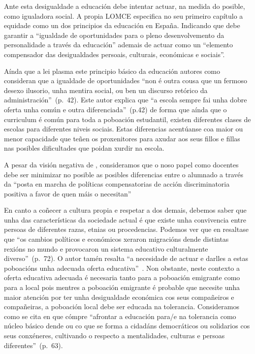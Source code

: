 Ante esta desigualdade a educación debe intentar actuar, na medida do posible, como igualadora social. A propia LOMCE especifica no seu primeiro capítulo a equidade como un dos principios da educación en España. Indicando que debe garantir a ``igualdade de oportunidades para o pleno desenvolvemento da personalidade a través da educación'' ademais de actuar como un ``elemento compensador das desigualdades persoais, culturais, económicas e sociais''.

Aínda que a lei plasma este principio básico da educación autores como  consideran que a igualdade de oportunidades ``non é outra cousa que un fermoso desexo ilusorio, unha mentira social, ou ben un discurso retórico da administración''~(p.~42). Este autor explica que ``a escola sempre fai unha dobre oferta unha común e outra diferenciada''~(p.42) de forma que aínda que o curriculum é común para toda a poboación estudantil, existen diferentes clases de escolas para diferentes niveis sociais. Estas diferencias acentúanse coa maior ou menor capacidade que teñen os proxenitores para axudar aos seus fillos e fillas nas posibles dificultades que poidan xurdir na escola.

A pesar da visión negativa de \citeauthor{funcionessocieles}, consideramos que o noso papel como docentes debe ser minimizar no posible as posibles diferencias entre o alumnado a través da ``posta en marcha de políticas compensatorias de acción discriminatoria positiva a favor de quen máis o necesitan''~\cite[p.~17]{sacristan2000educacion}

En canto a coñecer a cultura propia e respetar a dos demais, debemos saber que unha das características da sociedade actual é que existe unha convivencia entre persoas de diferentes razas, etnias ou procedencias. Podemos ver que en  resaltase que ``os cambios políticos e económicos xeraron migracións dende distintas rexións no mundo e provocaron un sistema educativo culturalmente diverso''~(p.~72). O autor tamén resalta ``a necesidade de actuar e darlles a estas poboacións unha adecuada oferta educativa''~\cite[p.~72]{rivera2014practica}. Non obstante, neste contexto a oferta educativa adecuada é necesaria tanto para a poboación emigrante como para a local pois mentres a poboación emigrante é probable que necesite unha maior atención por ter unha desigualdade económica cos seus compañeiros e compañeiras, a poboación local debe ser educada na tolerancia. Consideramos como se cita en   que cómpre ``afrontar a educación para/e na tolerancia como núcleo básico dende ou co que se forma a cidadáns democráticos ou solidarios cos seus conxéneres, cultivando o respecto a mentalidades, culturas e persoas diferentes''~(p.~63).

